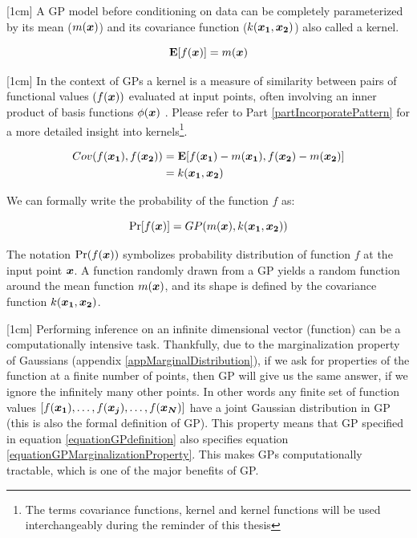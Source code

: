 [1cm]
A GP model before conditioning on data can be completely parameterized by its mean ($m(\boldsymbol{x})$) and its covariance function ($k(\boldsymbol{x_1}, \boldsymbol{x_2})$) also called a kernel. 

\begin{equation}\label{eq:meanGP}
\mathbf{E}[f(\boldsymbol{x})] = m(\boldsymbol{x})
\end{equation}

[1cm]
In the context of GPs a kernel is a measure of similarity between pairs of functional values $(f(\boldsymbol{x}))$ evaluated at input points, often involving an inner product of basis functions $\phi(\boldsymbol{x})$ \cite{bishop2006pattern}. Please refer to Part \ref{partIncorporatePattern} for a more detailed insight into kernels\footnote{The terms covariance functions, kernel and kernel functions will be used interchangeably during the reminder of this thesis}.

\begin{align}\label{eq:covarianceGP}
Cov(f(\boldsymbol{x_1}), f(\boldsymbol{x_2})) & = \mathbf{E}[f(\boldsymbol{x_1}) - m(\boldsymbol{x_1}), f(\boldsymbol{x_2}) - m(\boldsymbol{x_2})] \\
& = k(\boldsymbol{x_1}, \boldsymbol{x_2})
\end{align}

We can formally write the probability of the function $f$ as:

\begin{equation}\label{equationGPdefinition}
\Pr[f(\boldsymbol{x})] = GP(m(\boldsymbol{x}), k(\boldsymbol{x_1}, \boldsymbol{x_2}))
\end{equation}

The notation $\Pr(f(\boldsymbol{x}))$ symbolizes probability distribution of function $f$ at the input point $\boldsymbol{x}$. A function randomly drawn from a GP yields a random function around the mean function $m(\boldsymbol{x})$, and its shape is defined by the covariance function $k(\boldsymbol{x_1}, \boldsymbol{x_2})$. 

[1cm]
Performing inference on an infinite dimensional vector (function) can be a computationally intensive task. Thankfully, due to the marginalization property of Gaussians (appendix \ref{appMarginalDistribution}), if we ask for properties of the function at a finite number of points, then  GP will give us the same answer, if we ignore the infinitely many other points. In other words any finite set of function values $[f(\boldsymbol{x_1}), \ldots, f(\boldsymbol{x_j}), \ldots, f(\boldsymbol{x_N})]$ have a joint Gaussian distribution in GP (this is also the formal definition of GP). This property means that GP specified in equation \ref{equationGPdefinition} also specifies equation \ref{equationGPMarginalizationProperty}. This makes GPs computationally tractable, which is one of the major benefits of GP. 

